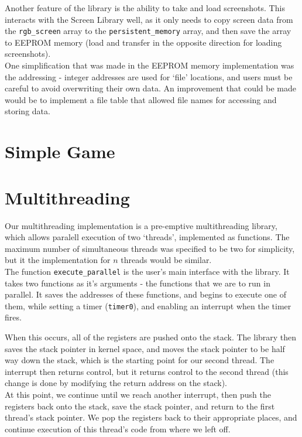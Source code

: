 \documentclass[pdftex,twoside,a4paper]{article}
\begin{document}
Another feature of the library is the ability to take and load screenshots. This interacts with the Screen Library well, as it only needs to copy screen data from the \texttt{rgb\_screen} array to the \texttt{persistent\_memory} array, and then save the array to EEPROM memory (load and transfer in the opposite direction for loading screenshots).\\

One simplification that was made in the EEPROM memory implementation was the addressing - integer addresses are used for `file' locations, and users must be careful to avoid overwriting their own data. An improvement that could be made would be to implement a file table that allowed file names for accessing and storing data.
\section*{Simple Game}

\section*{Multithreading}
Our multithreading implementation is a pre-emptive multithreading library, which allows paralell execution of two `threads', implemented as functions. The maximum number of simultaneous threads was specified to be two for simplicity, but it the implementation for $n$ threads would be similar.\\

The function \texttt{execute\_parallel} is the user's main interface with the library. It takes two functions as it's arguments - the functions that we are to run in parallel. It saves the addresses of these functions, and begins to execute one of them, while setting a timer (\texttt{timer0}), and enabling an interrupt when the timer fires.

When this occurs, all of the registers are pushed onto the stack. The library then saves the stack pointer in kernel space, and moves the stack pointer to be half way down the stack, which is the starting point for our second thread. The interrupt then returns control, but it returns control to the second thread (this change is done by modifying the return address on the stack).\\

At this point, we continue until we reach another interrupt, then push the registers back onto the stack, save the stack pointer, and return to the first thread's stack pointer. We pop the registers back to their appropriate places, and continue execution of this thread's code from where we left off.\\
\end{document}
